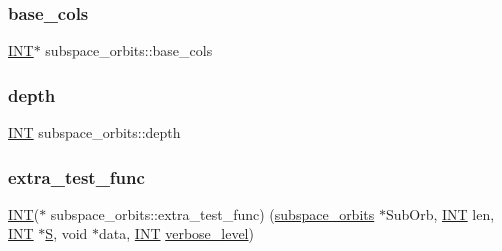 \subsubsection{\texorpdfstring{base\+\_\+cols}{base\_cols}}
{\footnotesize\ttfamily \mbox{\hyperlink{galois_8h_a09fddde158a3a20bd2dcadb609de11dc}{I\+NT}}$\ast$ subspace\+\_\+orbits\+::base\+\_\+cols}

\mbox{\label{classsubspace__orbits_a956f599626b814169a93e8a8d9d05951}} 
\subsubsection{\texorpdfstring{depth}{depth}}
{\footnotesize\ttfamily \mbox{\hyperlink{galois_8h_a09fddde158a3a20bd2dcadb609de11dc}{I\+NT}} subspace\+\_\+orbits\+::depth}

\mbox{\label{classsubspace__orbits_ad8a14be0379de2f5b2ac5e652a460dd8}} 
\subsubsection{\texorpdfstring{extra\+\_\+test\+\_\+func}{extra\_test\_func}}
{\footnotesize\ttfamily \mbox{\hyperlink{galois_8h_a09fddde158a3a20bd2dcadb609de11dc}{I\+NT}}($\ast$ subspace\+\_\+orbits\+::extra\+\_\+test\+\_\+func) (\mbox{\hyperlink{classsubspace__orbits}{subspace\+\_\+orbits}} $\ast$Sub\+Orb, \mbox{\hyperlink{galois_8h_a09fddde158a3a20bd2dcadb609de11dc}{I\+NT}} len, \mbox{\hyperlink{galois_8h_a09fddde158a3a20bd2dcadb609de11dc}{I\+NT}} $\ast$\mbox{\hyperlink{simeon_8_c_adab47f8243f1b5a2c31df2535d6b37d0}{S}}, void $\ast$data, \mbox{\hyperlink{galois_8h_a09fddde158a3a20bd2dcadb609de11dc}{I\+NT}} \mbox{\hyperlink{simeon_8_c_a818073fbcc2f439e7c56952f67386122}{verbose\+\_\+level}})}

\mbox{\label{classsubspace__orbits_a8a125bc042a277c38af19df5346ca5ff}} 
